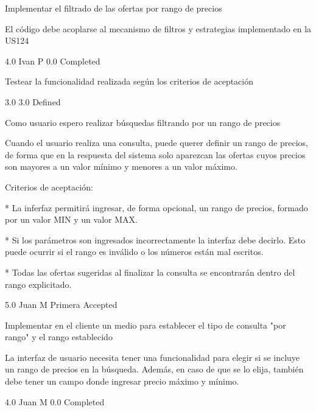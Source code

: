 		{Implementar el filtrado de las ofertas por rango de precios} %
		{El código debe acoplarse al mecanismo de filtros y estrategias implementado en
la US124

} %
		{4.0} %
		{Ivan P} %
		{0.0} %
		{Completed} %

		{Testear la funcionalidad realizada según los criterios de aceptación} %
		{

} %
		{3.0} %
		{} %
		{3.0} %
		{Defined} %


\vspace{20pt}

	{Como usuario espero realizar búsquedas filtrando por un rango de precios} %
	{Cuando el usuario realiza una consulta, puede querer definir un rango de
precios, de forma que en la respuesta del sistema solo aparezcan las ofertas
cuyos precios son mayores a un valor mínimo y menores a un valor máximo.

  
Criterios de aceptación:

  

* La inferfaz permitirá ingresar, de forma opcional, un rango de precios, formado por un valor MIN y un valor MAX.  

* Si los parámetros son ingresados incorrectamente la interfaz debe decirlo. Esto puede ocurrir si el rango es inválido o los números están mal escritos.

* Todas las ofertas sugeridas al finalizar la consulta se encontrarán dentro del rango explicitado.  

} %
	{} %
	{5.0} %
	{Juan M} %
	{Primera} %
	{Accepted} %

		{Implementar en el cliente un medio para establecer el tipo de consulta "por rango" y el rango establecido} %
		{La interfaz de usuario necesita tener una funcionalidad para elegir si se
incluye un rango de precios en la búsqueda. Además, en caso de que se lo
elija, también debe tener un campo donde ingresar precio máximo y mínimo.

} %
		{4.0} %
		{Juan M} %
		{0.0} %
		{Completed} %

